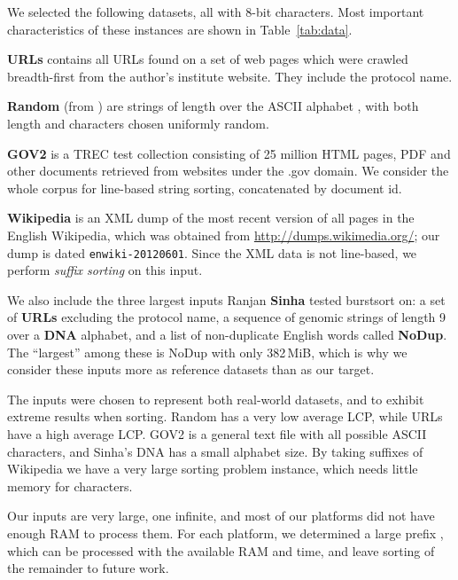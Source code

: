 \documentclass[a4paper]{myjournal}
\begin{document}
We selected the following datasets, all with 8-bit characters. Most important
characteristics of these instances are shown in Table~\ref{tab:data}.

\textbf{URLs} contains all URLs found on a set of web pages which were crawled
breadth-first from the author's institute website. They include the protocol
name.

\textbf{Random} (from \cite{sinha2004cache-conscious}) are strings of length
 over the ASCII alphabet , with both length and characters
chosen uniformly random.

\textbf{GOV2} is a TREC test collection consisting of 25 million HTML pages, PDF
and other documents retrieved from websites under the .gov domain. We
consider the whole corpus for line-based string sorting, concatenated by
document id.

\textbf{Wikipedia} is an XML dump of the most recent version of all pages in the
English Wikipedia, which was obtained from \url{http://dumps.wikimedia.org/};
our dump is dated \texttt{enwiki-20120601}.  Since the XML data is not
line-based, we perform \emph{suffix sorting} on this input.

We also include the three largest inputs Ranjan \textbf{Sinha}
\cite{sinha2004cache-conscious} tested burstsort on: a set of \textbf{URLs}
excluding the protocol name, a sequence of genomic strings of length 9 over a
\textbf{DNA} alphabet, and a list of non-duplicate English words called
\textbf{NoDup}. The ``largest'' among these is NoDup with only 382\,MiB, which
is why we consider these inputs more as reference datasets than as our target.

The inputs were chosen to represent both real-world datasets, and to exhibit
extreme results when sorting. Random has a very low average LCP, while URLs have
a high average LCP. GOV2 is a general text file with all possible ASCII
characters, and Sinha's DNA has a small alphabet size. By taking suffixes of
Wikipedia we have a very large sorting problem instance, which needs little
memory for characters.

Our inputs are very large, one infinite, and most of our platforms did not have
enough RAM to process them. For each platform, we determined a large prefix
, which can be processed with the available RAM and time, and leave
sorting of the remainder to future work.
\end{document}
